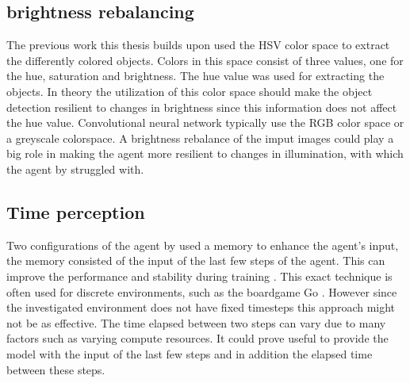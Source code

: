 

\subsection{brightness rebalancing}

The previous work this thesis builds upon used the HSV color space to extract the differently colored objects. Colors in this space consist of three values, one for the hue, saturation and brightness. The hue value was used for extracting the objects. In theory the utilization of this color space should make the object detection resilient to changes in brightness since this information does not affect the hue value.
Convolutional neural network typically use the RGB color space or a greyscale colorspace. A brightness rebalance of the imput images could play a big role in making the agent more resilient to changes in illumination, with which the agent by \autocite{maximilian} struggled with.


\subsection{Time perception}

Two configurations of the agent by \autocite{maximilian} used a memory to enhance the agent's input, the memory consisted of the input of the last few steps of the agent. This can improve the performance and stability during training \autocite{memory}.
This exact technique is often used for discrete environments, such as the boardgame Go \autocite{alphago}. However since the investigated environment does not have fixed timesteps this approach might not be as effective. The time elapsed between two steps can vary due to many factors such as varying compute resources. It could prove useful to provide the model with the input of the last few steps and in addition the elapsed time between these steps.
















